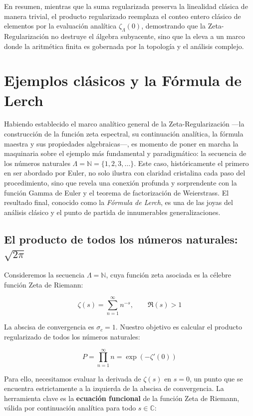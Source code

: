 En resumen, mientras que la suma regularizada preserva la linealidad clásica de manera trivial, el producto regularizado reemplaza el conteo entero clásico de elementos por la evaluación analítica $\zeta_\Lambda(0)$, demostrando que la Zeta-Regularización no destruye el álgebra subyacente, sino que la eleva a un marco donde la aritmética finita es gobernada por la topología y el análisis complejo.

\section{Ejemplos clásicos y la Fórmula de Lerch}

Habiendo establecido el marco analítico general de la Zeta-Regularización —la construcción de la función zeta espectral, su continuación analítica, la fórmula maestra y sus propiedades algebraicas—, es momento de poner en marcha la maquinaria sobre el ejemplo más fundamental y paradigmático: la secuencia de los números naturales $\Lambda = \mathbb{N} = \{1, 2, 3, \dots\}$. Este caso, históricamente el primero en ser abordado por Euler, no solo ilustra con claridad cristalina cada paso del procedimiento, sino que revela una conexión profunda y sorprendente con la función Gamma de Euler y el teorema de factorización de Weierstrass. El resultado final, conocido como la \textit{Fórmula de Lerch}, es una de las joyas del análisis clásico y el punto de partida de innumerables generalizaciones.

\subsection{El producto de todos los números naturales: $\sqrt{2\pi}$}

Consideremos la secuencia $\Lambda = \mathbb{N}$, cuya función zeta asociada es la célebre función Zeta de Riemann:

$$ \zeta(s) = \sum_{n=1}^{\infty} n^{-s}, \qquad \Re(s) > 1 $$

La abscisa de convergencia es $\sigma_c = 1$. Nuestro objetivo es calcular el producto regularizado de todos los números naturales:

$$ P = \prod_{n=1}^{\infty} n = \exp(-\zeta'(0)) $$

Para ello, necesitamos evaluar la derivada de $\zeta(s)$ en $s=0$, un punto que se encuentra estrictamente a la izquierda de la abscisa de convergencia. La herramienta clave es la \textbf{ecuación funcional} de la función Zeta de Riemann, válida por continuación analítica para todo $s \in \mathbb{C}$:

